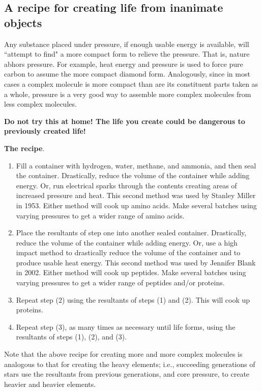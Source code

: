\documentclass{article}
\renewcommand{\labelenumi}{\roman{enumi}.}
\theoremstyle{definition}
\begin{document}
\subsection{A recipe for creating life from inanimate objects}

Any substance placed under pressure, if enough usable energy is available, will ``attempt to find" a more compact form to relieve the pressure. That is, nature abhors pressure. For example, heat energy and pressure is used to force pure carbon to assume the more compact diamond form. Analogously, since in most cases a complex molecule is more compact than are its constituent parts taken as a whole, pressure is a very good way to assemble more complex molecules from less complex molecules.

\bigskip

\textbf{Do not try this at home! The life you create could be dangerous to previously created life!}

\bigskip

\textbf{The recipe}.
\renewcommand{\labelenumi}{(\arabic{enumi})}
\begin{enumerate}
\item Fill a container with hydrogen, water, methane, and ammonia, and then seal the container. Drastically, reduce the volume of the container while adding energy. Or, run electrical sparks through the contents creating areas of increased pressure and heat. This second method was used by Stanley Miller in 1953. Either method will cook up amino acids. Make several batches using varying pressures to get a wider range of amino acids.
\item Place the resultants of step one into another sealed container. Drastically, reduce the volume of the container while adding energy. Or, use a high impact method to drastically reduce the volume of the container and to produce usable heat energy. This second method was used by Jennifer Blank in 2002. Either method will cook up peptides. Make several batches using varying pressures to get a wider range of peptides and/or proteins.
\item Repeat step (2) using the resultants of steps (1) and (2). This will cook up proteins.
\item Repeat step (3), as many times as necessary until life forms, using the resultants of steps (1), (2), and (3).
\end{enumerate}

Note that the above recipe for creating more and more complex molecules is analogous to that for creating the heavy elements; i.e., succeeding generations of stars use the resultants from previous generations, and core pressure, to create heavier and heavier elements.
\end{document}

